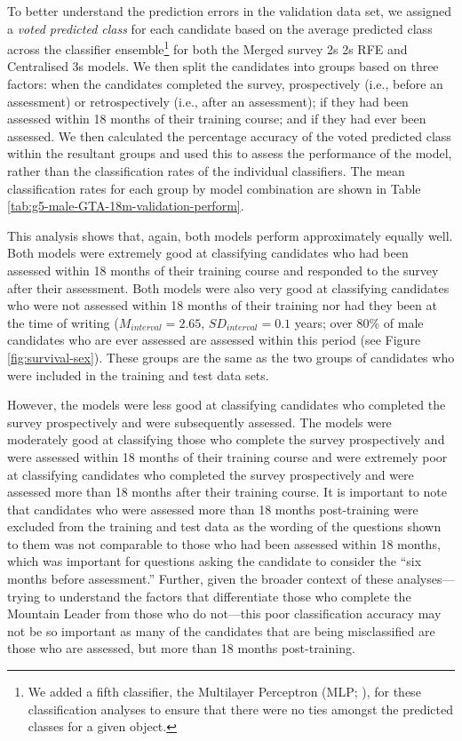 \documentclass[
  12pt,
  a4paper,
]{book}
\begin{document}
To better understand the prediction errors in the validation data set, we assigned a \emph{voted predicted class} for each candidate based on the average predicted class across the classifier ensemble\footnote{We added a fifth classifier, the Multilayer Perceptron (MLP; \citet{Bishop2006}), for these classification analyses to ensure that there were no ties amongst the predicted classes for a given object.} for both the Merged survey 2s 2s RFE and Centralised 3s models. We then split the candidates into groups based on three factors: when the candidates completed the survey, prospectively (i.e., before an assessment) or retrospectively (i.e., after an assessment); if they had been assessed within 18 months of their training course; and if they had ever been assessed. We then calculated the percentage accuracy of the voted predicted class within the resultant groups and used this to assess the performance of the model, rather than the classification rates of the individual classifiers. The mean classification rates for each group by model combination are shown in Table \ref{tab:g5-male-GTA-18m-validation-perform}.

This analysis shows that, again, both models perform approximately equally well. Both models were extremely good at classifying candidates who had been assessed within 18 months of their training course and responded to the survey after their assessment. Both models were also very good at classifying candidates who were not assessed within 18 months of their training nor had they been at the time of writing (\(M_{interval} = 2.65\), \(SD_{interval} = 0.1\) years; over 80\% of male candidates who are ever assessed are assessed within this period (see Figure \ref{fig:survival-sex}). These groups are the same as the two groups of candidates who were included in the training and test data sets.

However, the models were less good at classifying candidates who completed the survey prospectively and were subsequently assessed. The models were moderately good at classifying those who complete the survey prospectively and were assessed within 18 months of their training course and were extremely poor at classifying candidates who completed the survey prospectively and were assessed more than 18 months after their training course. It is important to note that candidates who were assessed more than 18 months post-training were excluded from the training and test data as the wording of the questions shown to them was not comparable to those who had been assessed within 18 months, which was important for questions asking the candidate to consider the ``six months before assessment.'' Further, given the broader context of these analyses---trying to understand the factors that differentiate those who complete the Mountain Leader from those who do not---this poor classification accuracy may not be so important as many of the candidates that are being misclassified are those who are assessed, but more than 18 months post-training.
\end{document}
